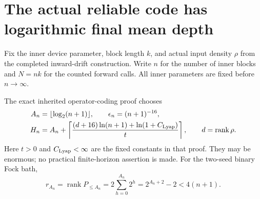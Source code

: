 
\section{The actual reliable code has logarithmic final mean depth}
\label{sec:code-depth-budget}

Fix the inner device parameter, block length $k$, and actual input density
$\rho$ from the completed inward-drift construction. Write $n$ for the
number of inner blocks and $N=nk$ for the counted forward calls. All
inner parameters are fixed before $n\to\infty$.

The exact inherited operator-coding proof chooses
\begin{align*}
 A_n&=\lfloor\log_2(n+1)\rfloor,\qquad
 \epsilon_n=(n+1)^{-16},\\
 H_n&=A_n+\left\lceil
 \frac{(d+16)\ln(n+1)+\ln(1+C_{\rm Lyap})}{t}
 \right\rceil,
 \qquad d=\operatorname{rank}\rho.
\end{align*}
Here $t>0$ and $C_{\rm Lyap}<\infty$ are the fixed constants in that
proof. They may be enormous; no practical finite-horizon assertion is
made. For the two-seed binary Fock bath,
\[
 r_{A_n}=\operatorname{rank}P_{\le A_n}
 =2\sum_{h=0}^{A_n}2^h=2^{A_n+2}-2<4(n+1).
\]

